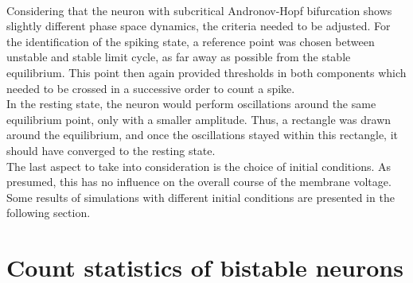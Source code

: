 \documentclass[12pt,a4paper]{article}
\begin{document}
\\
Considering that the neuron with subcritical Andronov-Hopf bifurcation shows slightly different phase space dynamics, the criteria needed to be adjusted. For the identification of the spiking state, a reference point was chosen between unstable and stable limit cycle, as far away as possible from the stable equilibrium. This point then again provided thresholds in both components which needed to be crossed in a successive order to count a spike. \\
In the resting state, the neuron would perform oscillations around the same equilibrium point, only with a smaller amplitude. Thus, a rectangle was drawn around the equilibrium, and once the oscillations stayed within this rectangle, it should have converged to the resting state. \\
The last aspect to take into consideration is the choice of initial conditions. As presumed, this has no influence on the overall course of the membrane voltage. Some results of simulations with different initial conditions are presented in the following section.
\newpage
\section{Count statistics of bistable neurons}\label{countstat}
\end{document}
